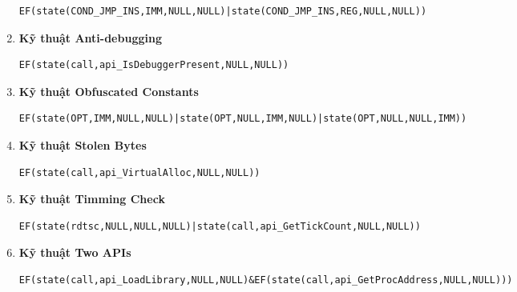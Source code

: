 \begin{enumerate}
{\begin{code}
\begin{lstlisting}[captionpos=b,caption={Mô tả CTL kỹ thuật Indirect Jump},label={lst:CTLIJ},frame=single,breaklines=true]
EF(state(COND_JMP_INS,IMM,NULL,NULL)|state(COND_JMP_INS,REG,NULL,NULL))
\end{lstlisting}
\end{code}
}
\item{\textbf{Kỹ thuật Anti-debugging}
\begin{code}
\begin{lstlisting}[captionpos=b,caption={Mô tả CTL kỹ thuật Anti-debugging},label={lst:CTLAD},frame=single,breaklines=true]
EF(state(call,api_IsDebuggerPresent,NULL,NULL))
\end{lstlisting}
\end{code}
}
\item{\textbf{Kỹ thuật Obfuscated Constants}
\begin{code}
\begin{lstlisting}[captionpos=b,caption={Mô tả CTL kỹ thuật Obfuscated Constants},label={lst:CTLOC},frame=single,breaklines=true]
EF(state(OPT,IMM,NULL,NULL)|state(OPT,NULL,IMM,NULL)|state(OPT,NULL,NULL,IMM))
\end{lstlisting}
\end{code}
}
\item{\textbf{Kỹ thuật Stolen Bytes}
\begin{code}
\begin{lstlisting}[captionpos=b,caption={Mô tả CTL kỹ thuật Stolen Bytes},label={lst:CTLSB},frame=single,breaklines=true]
EF(state(call,api_VirtualAlloc,NULL,NULL))
\end{lstlisting}
\end{code}
}
\item{\textbf{Kỹ thuật Timming Check}
\begin{code}
\begin{lstlisting}[captionpos=b,caption={Mô tả CTL kỹ thuật Timming Check},label={lst:CTLTC},frame=single,breaklines=true]
EF(state(rdtsc,NULL,NULL,NULL)|state(call,api_GetTickCount,NULL,NULL))
\end{lstlisting}
\end{code}
}
\item{\textbf{Kỹ thuật Two APIs}
\begin{code}
\begin{lstlisting}[captionpos=b,caption={Mô tả CTL kỹ thuật Two APIs},label={lst:CTL2API},frame=single,breaklines=true]
EF(state(call,api_LoadLibrary,NULL,NULL)&EF(state(call,api_GetProcAddress,NULL,NULL)))
\end{lstlisting}
\end{code}
}
\end{enumerate}





